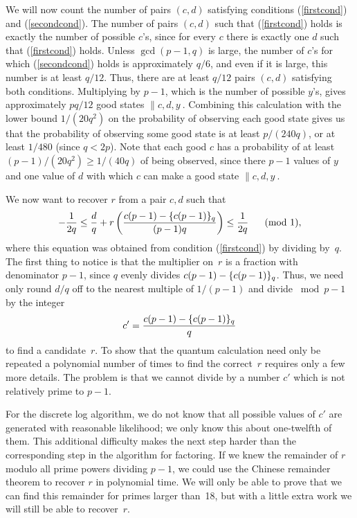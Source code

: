 We will now count the number of pairs $(c,d)$ satisfying conditions
(\ref{firstcond}) and (\ref{secondcond}).
The number of pairs $(c,d)$ such
that (\ref{firstcond}) holds is exactly the number of possible 
$c$'s, since 
for every $c$ there is exactly one $d$ such that (\ref{firstcond})
holds.  Unless $\gcd(p-1,q)$ is large, the number of $c$'s
for which (\ref{secondcond}) holds is approximately $q/6$, and even if
it is large, this number is at least $q/12$.  
Thus, 
there are at least $q/12$ pairs $(c,d)$ satisfying 
both conditions.  Multiplying by $p-1$,
which is the number of possible $y$'s, gives approximately
$pq/12$ good states $\|c,d,y\>$.  Combining this calculation with the lower
bound $1/(20q^2)$ on the probability of observing
each good state gives us that the 
probability of observing some good state is at least $p/(240q)$, or at 
least $1/480$ (since $q < 2p$).  Note that each good
$c$ has a probability of at least $(p-1)/(20q^2) \geq 1/(40q)$ of being 
observed, since there $p-1$ values of $y$ and one value of $d$ with
which $c$ can make a good state $\|c,d,y\>$.

We now want to recover $r$ from a pair $c,d$ such that 
\begin{equation}
-\frac{1}{2q} \leq 
\frac{d}{q} + r\left(\frac{c(p-1)-{\{c(p-1)\}_{q}}}{(p-1)q}\right) \leq
\frac{1}{2q} \ \ \ \  {\rm \ (mod\ }1),
\end{equation}
where this equation was obtained from condition (\ref{firstcond}) by 
dividing by~$q$.  The first thing to notice is that the multiplier on~$r$ 
is a fraction with denominator $p-1$, since $q$ evenly divides 
$c(p-1) - {\{c(p-1)\}_{q}}$.  Thus, we
need only round $d/q$ off to the nearest multiple of $1/(p-1)$ and divide
$\bmod{p-1}$ by the integer
\begin{equation}
c' = \frac{c(p-1)-{\{c(p-1)\}_{q}}}{q}
\label{definecprime}
\end{equation}
to find a candidate~$r$.  To show that the quantum calculation need
only be repeated a polynomial number of times to find the correct~$r$
requires only a few more details.  The problem is that we cannot
divide by a number $c'$ which is not relatively prime to $p-1$.

For the 
discrete log algorithm, we do not know that all possible values
of $c'$ are generated with reasonable likelihood; we only know this about
one-twelfth of them.  This additional difficulty makes the next step harder
than the corresponding step in the algorithm for factoring.  If we knew the
remainder of $r$ modulo all prime powers dividing $p-1$, we could use the
Chinese remainder theorem to recover $r$ in polynomial time.  We will only
be able to prove that we can find this remainder
for primes larger than~18, but with a little extra work
we will still be able to recover~$r$.

